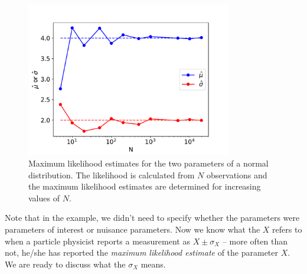 \begin{figure}[hbt!]
    \centering
    \includegraphics[width=0.8\textwidth]{figures/Intervals/Consistency_normal.pdf}
    \caption{Maximum likelihood estimates for the two parameters of a normal distribution. The likelihood is calculated from $N$ observations and the maximum likelihood estimates are determined for increasing values of $N$.}
    \label{fig:example_mle_normal}
\end{figure}
Note that in the example, we didn't need to specify whether the parameters were parameters of interest or nuisance parameters. Now we know what the $X$ refers to when a particle physicist reports a measurement as $X\pm\sigma_{X}$ -- more often than not, he/she has reported the \emph{maximum likelihood estimate} of the parameter $X$.  We are ready to discuss what the $\sigma_{X}$ means. 

